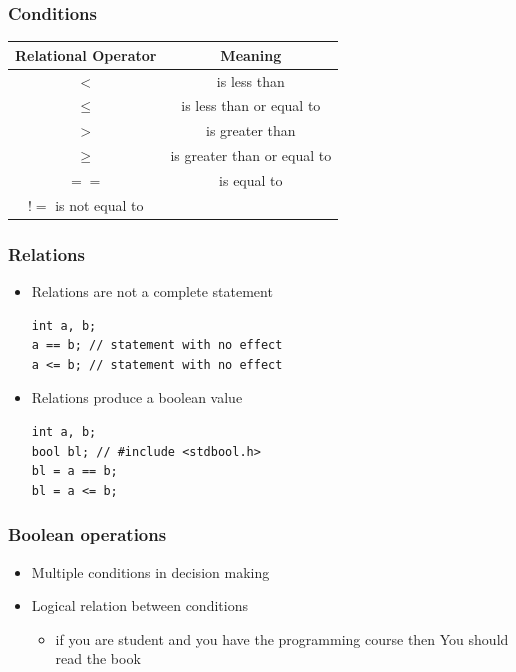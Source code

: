 \documentclass{../c-lecture}
\begin{document}
\begin{frame}
  \frametitle{Conditions}
  \begin{table}
  \begin{tabular}{cc}
    \toprule

    Relational Operator &
    Meaning \\

    \midrule

    $<$ &
    is less than \\

    \midrule

    $\leq$ &
    is less than or equal to \\

    \midrule

    $>$ &
    is greater than \\

    \midrule

    $\geq$ &
    is greater than or equal to \\

    \midrule

    $==$ &
    is equal to \\

    \midrule

    $!=$
    is not equal to \\

    \bottomrule
  \end{tabular}
  \end{table}
\end{frame}

\begin{frame}[fragile]
  \frametitle{Relations}
  \begin{itemize}
    \item Relations are not a complete statement
    \begin{verbatim}
int a, b;
a == b; // statement with no effect
a <= b; // statement with no effect
    \end{verbatim}
    \item Relations produce a boolean value
    \begin{verbatim}
int a, b;
bool bl; // #include <stdbool.h>
bl = a == b;
bl = a <= b;
    \end{verbatim}
  \end{itemize}
\end{frame}

\begin{frame}
  \frametitle{Boolean operations}
  \begin{itemize}
    \item Multiple conditions in decision making
    \item Logical relation between conditions
    \begin{itemize}
      \item
        \textmd{\color{LimeGreen} if} you are student
        \textmd{\color{YellowOrange} and} you have the programming course
        \textmd{\color{Turquoise} then} You should read the book
    \end{itemize}
  \end{itemize}
\end{frame}
\end{document}

